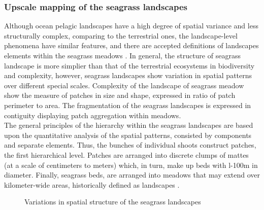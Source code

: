 \documentclass[10pt, a4paper]{article}
\begin{document}
\subsubsection{Upscale mapping of the seagrass landscapes}
Although ocean pelagic landscapes have a high degree of spatial variance and less structurally
complex, comparing to the terrestrial ones, the landscape-level phenomena have similar features, and
there are accepted definitions of landscapes elements within the seagrass meadows \cite{Robbins94}\label{Robbins94}. 
In general, the structure of seagrass landscape is more simplier than that of the terrestrial
ecosystems in biodiversity and complexity, however, seagrass landscapes show variation in spatial
patterns over different special scales. Complexity of the landscape of seagrass meadow show the
measure of patches in size and shape, expressed in ratio of patch perimeter to area. The fragmentation
of the seagrass landscapes is expressed in contiguity displaying patch aggregation within meadows.\\
The general principles of the hierarchy within the seagrass landscapes are based upon the quantitative
analysis of the spatial patterns, consisted by components and separate elements. Thus, the bunches of
individual shoots construct patches, the first hierarchical level. Patches are arranged into discrete
clumps of mattes (at a scale of centimeters to meters) which, in turn, make up beds with l-100m in
diameter. Finally, seagrass beds, are arranged into meadows that may extend over kilometer-wide
areas, historically defined as landscapes \cite{Robbins94}\label{Robbins94}.

\begin{figure}[h]
	\centering
	\caption{Variations in spatial structure of the seagrass landscapes}
	\label{fig:40}
\end{figure}
\end{document}
